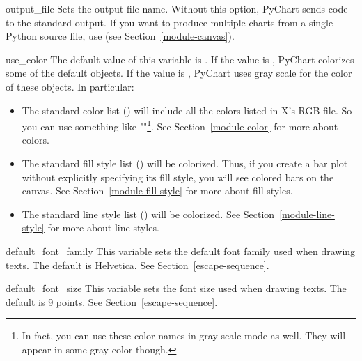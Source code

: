 \documentclass{howto}
\newcommand{\pychart}{PyChart}
\newcommand{\xref}[1]{See Section~\ref{#1}}
\newcommand{\pxref}[1]{see Section~\ref{#1}}
\begin{document}
\begin{datadesc}{output_file}
Sets the output file name. Without this option, \pychart{} sends code
to the standard output.
If you want to produce multiple charts from a single Python source file,
use  (\pxref{module-canvas}).
\end{datadesc}

\begin{datadesc}{use_color}
The default value of this variable is .
If the value is ,
\pychart{} colorizes some of the default objects.
If the value is , \pychart{} uses gray scale for the color of
these objects.
In particular:

\begin{itemize}
\item
The standard color list () will include all
the colors listed in X's RGB file. So you can use something like
""\footnote{In fact, you can use these color names
in gray-scale mode as well. They will appear in some gray color though.}.
\xref{module-color} for more about colors.

\item
The standard fill style list () will
be colorized.  Thus, if you create a bar plot without explicitly
specifying its fill style, you will see colored bars on the canvas.
\xref{module-fill-style} for more about fill styles.

\item
The standard line style list () will be colorized.
\xref{module-line-style} for more about line styles.
\end{itemize}

\end{datadesc}


\begin{datadesc}{default_font_family}
This variable sets the default font family used when
drawing texts.  The default is Helvetica.
\xref{escape-sequence}.
\end{datadesc}

\begin{datadesc}{default_font_size}
This variable sets the font size used when
drawing texts.  The default is 9 points.
\xref{escape-sequence}.
\end{datadesc}
\end{document}
